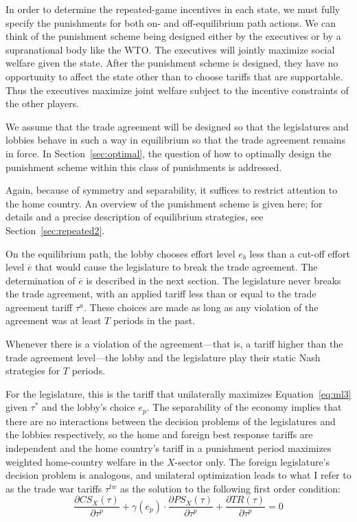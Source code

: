 \documentclass[authoryear, review]{elsarticle}
\newcommand{\ov}{\overline}
\newcommand{\ga}{\gamma}
\begin{document}
In order to determine the repeated-game incentives in each state, we must fully specify the punishments for both on- and off-equilibrium path actions. We can think of the punishment scheme being designed either by the executives or by a supranational body like the WTO. The executives will jointly maximize social welfare given the state. After the punishment scheme is designed, they have no opportunity to affect the state other than to choose tariffs that are supportable. Thus the executives maximize joint welfare subject to the incentive constraints of the other players.

We assume that the trade agreement will be designed so that the legislatures and lobbies behave in such a way in equilibrium so that the trade agreement remains in force. In Section~\ref{sec:optimal}, the question of how to optimally design the punishment scheme within this class of punishments is addressed.

Again, because of symmetry and separability, it suffices to restrict attention to the home country. An overview of the punishment scheme is given here; for details and a precise description of equilibrium strategies, see Section~\ref{sec:repeated2}.

On the equilibrium path, the lobby chooses effort level $e_b$ less than a cut-off effort level $\ov{e}$ that would cause the legislature to break the trade agreement. The determination of $\ov{e}$ is described in the next section. The legislature never breaks the trade agreement, with an applied tariff less than or equal to the trade agreement tariff $\tau^a$. These choices are made as long as any violation of the agreement was at least $T$ periods in the past.

Whenever there is a violation of the agreement---that is, a tariff higher than the trade agreement level---the lobby and the legislature play their static Nash strategies for $T$ periods.

For the legislature, this is the tariff that unilaterally maximizes Equation~\ref{eq:ml3} given $\tau^*$ and the lobby's choice $e_{p}$. The separability of the economy implies that there are no interactions between the decision problems of the legislatures and the lobbies respectively, so the home and foreign best response tariffs are independent and the home country's tariff in a punishment period maximizes weighted home-country welfare in the $X$-sector only. The foreign legislature's decision problem is analogous, and unilateral optimization leads to what I refer to as the trade war tariffs $\tau^{tw}$ as the solution to the following first order condition:
\[
		\frac{\partial \mathit{CS}_X(\tau)}{\partial \tau^{p}} + \ga(e_{p}) \cdot \frac{\partial \mathit{PS}_X(\tau)}{\partial \tau^{p}} +  \frac{\partial \mathit{TR}(\tau)}{\partial \tau^{p}} = 0
\]
\end{document}
